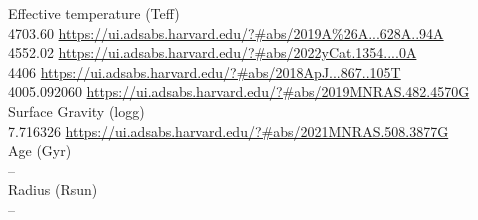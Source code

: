 Effective temperature (Teff) \\
4703.60 \url{https://ui.adsabs.harvard.edu/?#abs/2019A%26A...628A..94A}\\
4552.02 \url{https://ui.adsabs.harvard.edu/?#abs/2022yCat.1354....0A}\\
4406 \url{https://ui.adsabs.harvard.edu/?#abs/2018ApJ...867..105T}\\
4005.092060 \url{https://ui.adsabs.harvard.edu/?#abs/2019MNRAS.482.4570G}\\
Surface Gravity (logg) \\
7.716326 \url{https://ui.adsabs.harvard.edu/?#abs/2021MNRAS.508.3877G}\\
Age (Gyr)\\
--\\
Radius (Rsun)\\
--\\

